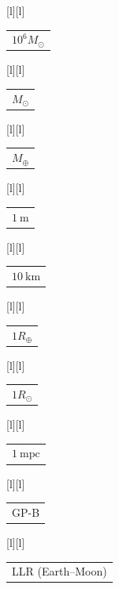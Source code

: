 %    
%
%
\begin{psfrags}%
\psfragscanon%
%
[l][l]{\color[rgb]{0.83529,0.36863,0}\setlength{\tabcolsep}{0pt}\begin{tabular}{l}$10^6 M_\odot$\end{tabular}}%
[l][l]{\color[rgb]{0.83529,0.36863,0}\setlength{\tabcolsep}{0pt}\begin{tabular}{l}$M_\odot$\end{tabular}}%
[l][l]{\color[rgb]{0.83529,0.36863,0}\setlength{\tabcolsep}{0pt}\begin{tabular}{l}$M_\oplus$\end{tabular}}%
[l][l]{\color[rgb]{0,0.44706,0.69804}\setlength{\tabcolsep}{0pt}\begin{tabular}{l}$1~\mathrm{m}$\end{tabular}}%
[l][l]{\color[rgb]{0,0.44706,0.69804}\setlength{\tabcolsep}{0pt}\begin{tabular}{l}$10~\mathrm{km}$\end{tabular}}%
[l][l]{\color[rgb]{0,0.44706,0.69804}\setlength{\tabcolsep}{0pt}\begin{tabular}{l}$1 R_\oplus$\end{tabular}}%
[l][l]{\color[rgb]{0,0.44706,0.69804}\setlength{\tabcolsep}{0pt}\begin{tabular}{l}$1 R_\odot$\end{tabular}}%
[l][l]{\color[rgb]{0,0.44706,0.69804}\setlength{\tabcolsep}{0pt}\begin{tabular}{l}$1~\mathrm{mpc}$\end{tabular}}%
[l][l]{\color[rgb]{0,0,0}\setlength{\tabcolsep}{0pt}\begin{tabular}{l}GP-B\end{tabular}}%
[l][l]{\color[rgb]{0,0,0}\setlength{\tabcolsep}{0pt}\begin{tabular}{l}LLR (Earth--Moon)\end{tabular}}%

\end{psfrags}
